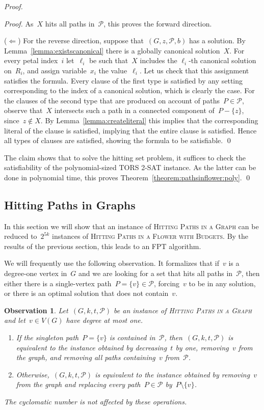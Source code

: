 \let\accentvec\vec  \documentclass{llncs}
\newtheorem{observation}{Observation}
\newcommand{\claimqed}{\renewcommand{\squareforqed}{$\lrcorner$}\qed\renewcommand{\squareforqed}{\plainsquareforqed}}
\renewcommand{\P}{\ensuremath{\mathcal{P}}\xspace}
\newcommand{\HitPathsInFlower}{\textsc{Hitting Paths in a Flower with Budgets}\xspace}
\newcommand{\HitPathsInGraph}{\textsc{Hitting Paths in a Graph}\xspace}
\newcommand{\TORSTwoSat}{\textsc{TORS 2-SAT}\xspace}
\begin{document}
\begin{proof}
\begin{proof}
\noindent As~$X$ hits all paths in~$\P$, this proves the forward direction.

($\Leftarrow$) For the reverse direction, suppose that~$(G,z,\P,b)$ has a solution. By Lemma~\ref{lemma:existscanonical} there is a globally canonical solution~$X$. For every petal index~$i$ let~$\ell_i$ be such that~$X$ includes the $\ell_i$-th canonical solution on~$R_i$, and assign variable~$x_i$ the value~$\ell_i$. Let us check that this assignment satisfies the formula. Every clause of the first type is satisfied by any setting corresponding to the index of a canonical solution, which is clearly the case. For the clauses of the second type that are produced on account of paths~$P \in \P$, observe that~$X$ intersects such a path in a connected component of~$P - \{z\}$, since~$z \not \in X$. By Lemma~\ref{lemma:createliteral} this implies that the corresponding literal of the clause is satisfied, implying that the entire clause is satisfied. Hence all types of clauses are satisfied, showing the formula to be satisfiable.
\claimqed
\end{proof}

The claim shows that to solve the hitting set problem, it suffices to check the satisfiability of the polynomial-sized \TORSTwoSat instance. As the latter can be done in polynomial time, this proves Theorem~\ref{theorem:pathsinflower:poly}.
\qed
\end{proof}

\subsection{Hitting Paths in Graphs} \label{subsection:hit:paths}

In this section we will show that an instance of \HitPathsInGraph can be reduced to~$2^{5k}$ instances of \HitPathsInFlower. By the results of the previous section, this leads to an FPT algorithm. 

We will frequently use the following observation. It formalizes that if~$v$ is a degree-one vertex in~$G$ and we are looking for a set that hits all paths in~$\P$, then either there is a single-vertex path~$P = \{v\} \in \P$, forcing~$v$ to be in any solution, or there is an optimal solution that does not contain~$v$.

\begin{observation} \label{observation:removeleaf}
Let~$(G,k,t,\P)$ be an instance of \HitPathsInGraph and let~$v \in V(G)$ have degree at most one. 
\begin{enumerate}
	\item If the singleton path~$P = \{v\}$ is contained in~$\P$, then~$(G,k,t,\P)$ is equivalent to the instance obtained by decreasing~$t$ by one, removing~$v$ from the graph, and removing all paths containing~$v$ from~$\P$.
	\item Otherwise,~$(G,k,t,\P)$ is equivalent to the instance obtained by removing~$v$ from the graph and replacing every path~$P \in \P$ by~$P \setminus \{v\}$.
\end{enumerate}
The cyclomatic number is not affected by these operations.
\end{observation}
\end{document}
